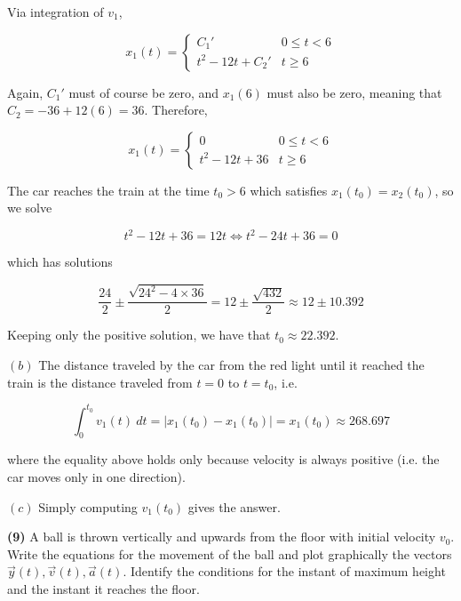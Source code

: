 \documentclass[12pt]{article}
\theoremstyle{definition}
\begin{document}
Via integration of $v_1$,

\begin{equation}
    x_1(t) = \begin{cases}
        C_1' & 0 \leq t < 6 \\ 
        t^2 -12 t + C_2' & t \geq 6
    \end{cases}
\end{equation}

Again, $C_1'$ must of course be zero, and $x_1(6)$ must also be zero, meaning
that $C_2 = -36 + 12(6) = 36$. Therefore,

\begin{equation}
    x_1(t) = \begin{cases}
        0 & 0 \leq t < 6 \\ 
        t^2 -12 t + 36 & t \geq 6
    \end{cases}
\end{equation}

The car reaches the train at the time $t_0 > 6$ which satisfies $x_1(t_0) =
x_2(t_0)$, so we solve

\begin{equation*}
    t^2 - 12t + 36 = 12t \iff t^2 - 24t + 36 = 0
\end{equation*}

which has solutions

\begin{equation*}
    \frac{24}{2} \pm \frac{\sqrt{24^2 - 4 \times 36} }{2} = 12 \pm 
    \frac{\sqrt{432} }{2} \approx 12 \pm 10.392
\end{equation*}

Keeping only the positive solution, we have that $t_0 \approx 22.392$. 


$(b)$ The distance traveled by the car from the red light until it reached the
train is the distance traveled from $t = 0$ to $t = t_0$, i.e. 

\begin{equation*}
    \int_0^{t_0} v_1(t) ~ dt = |x_1(t_0) - x_1(t_0)| = x_1(t_0) \approx 268.697
\end{equation*}

where the equality above holds only because velocity is always positive (i.e.
the car moves only in one direction).

$(c)$ Simply computing $v_1(t_0)$ gives the answer.

\pagebreak 

\begin{shaded}
    \textbf{(9)} A ball is thrown vertically and upwards from the floor with
    initial velocity $v_0$. Write the equations for the movement of the ball and
    plot graphically the vectors $\vec{y}(t), \vec{v}(t), \vec{a}(t)$. Identify
    the conditions for the instant of maximum height and the instant it reaches
    the floor.
\end{shaded}
\end{document}
